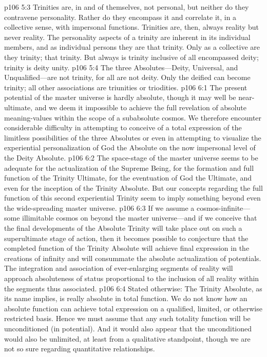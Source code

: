 \vs p106 5:3 Trinities are, in and of themselves, not personal, but neither do they contravene personality. Rather do they encompass it and correlate it, in a collective sense, with impersonal functions. Trinities are, then, always  reality but never  reality. The personality aspects of a trinity are inherent in its individual members, and as individual persons they are  that trinity. Only as a collective are they trinity; that  trinity. But always is trinity inclusive of all encompassed deity; trinity is deity unity.\plusone
\vs p106 5:4 The three Absolutes---Deity, Universal, and Unqualified---are not trinity, for all are not deity. Only the deified can become trinity; all other associations are triunities or triodities.
\vs p106 6:1 The present potential of the master universe is hardly absolute, though it may well be near\hyp{}ultimate, and we deem it impossible to achieve the full revelation of absolute meaning\hyp{}values within the scope of a subabsolute cosmos. We therefore encounter considerable difficulty in attempting to conceive of a total expression of the limitless possibilities of the three Absolutes or even in attempting to visualize the experiential personalization of God the Absolute on the now impersonal level of the Deity Absolute.
\vs p106 6:2 The space\hyp{}stage of the master universe seems to be adequate for the actualization of the Supreme Being, for the formation and full function of the Trinity Ultimate, for the eventuation of God the Ultimate, and even for the inception of the Trinity Absolute. But our concepts regarding the full function of this second experiential Trinity seem to imply something beyond even the wide\hyp{}spreading master universe.
\vs p106 6:3 If we assume a cosmos\hyp{}infinite---some illimitable cosmos on beyond the master universe---and if we conceive that the final developments of the Absolute Trinity will take place out on such a superultimate stage of action, then it becomes possible to conjecture that the completed function of the Trinity Absolute will achieve final expression in the creations of infinity and will consummate the absolute actualization of  potentials. The integration and association of ever\hyp{}enlarging segments of reality will approach absoluteness of status proportional to the inclusion of all reality within the segments thus associated.
\vs p106 6:4 Stated otherwise: The Trinity Absolute, as its name implies, is really absolute in total function. We do not know how an absolute function can achieve total expression on a qualified, limited, or otherwise restricted basis. Hence we must assume that any such totality function will be unconditioned (in potential). And it would also appear that the unconditioned would also be unlimited, at least from a qualitative standpoint, though we are not so sure regarding quantitative relationships.
